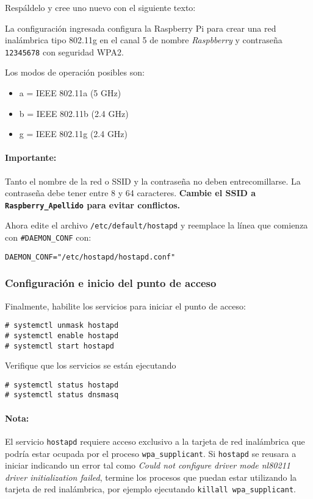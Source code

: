 Respáldelo y cree uno nuevo con el siguiente texto:


La configuración ingresada configura la Raspberry Pi para crear una red inalámbrica tipo 802.11g en el canal 5 de nombre \emph{Raspbberry} y contraseña \texttt{12345678} con seguridad WPA2.

Los modos de operación posibles son:
\begin{itemize}[nosep]
\item a = IEEE 802.11a (5 GHz)
\item b = IEEE 802.11b (2.4 GHz)
\item g = IEEE 802.11g (2.4 GHz)
\end{itemize}

\paragraph*{Importante:} Tanto el nombre de la red o SSID y la contraseña no deben entrecomillarse. La contraseña debe tener entre 8 y 64 caracteres. \textbf{Cambie el SSID a \texttt{Raspberry\_Apellido} para evitar conflictos.}\medskip

Ahora edite el archivo \texttt{/etc/default/hostapd} y reemplace la línea que comienza con \texttt{\#DAEMON\_CONF} con:

\begin{Verbatim}
DAEMON_CONF="/etc/hostapd/hostapd.conf"
\end{Verbatim}

\subsubsection{Configuración e inicio del punto de acceso}%
\label{sec:ap-hotspot}
Finalmente, habilite los servicios para iniciar el punto de acceso:

\begin{Verbatim}
# systemctl unmask hostapd
# systemctl enable hostapd
# systemctl start hostapd
\end{Verbatim}

Verifique que los servicios se están ejecutando

\begin{Verbatim}
# systemctl status hostapd
# systemctl status dnsmasq
\end{Verbatim}

\paragraph*{Nota:} El servicio \texttt{hostapd} requiere acceso exclusivo a la tarjeta de red inalámbrica que podría estar ocupada por el proceso \texttt{wpa\_supplicant}.
Si \texttt{hostapd} se reusara a iniciar indicando un error tal como \emph{Could not configure driver mode nl80211 driver initialization failed}, termine los procesos que puedan estar utilizando la tarjeta de red inalámbrica, por ejemplo ejecutando \texttt{killall wpa\_supplicant}.

